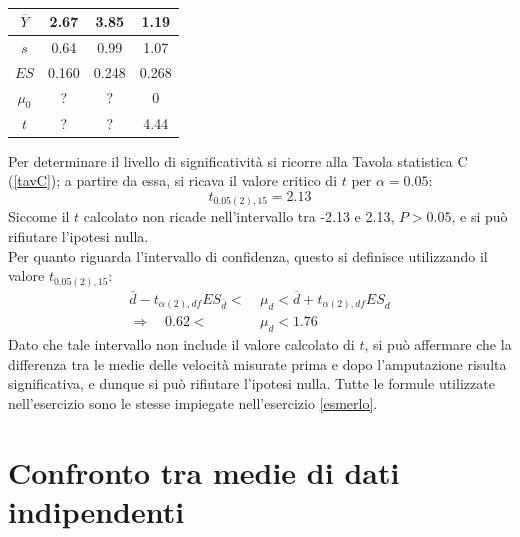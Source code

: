 \documentclass[10pt, draft]{book}
\newcounter{example}[section]
\begin{document}
\begin{example}
\begin{table}[H]
\begin{tabular}{c|c|c||c}
        \textbf{$\overline{Y}$} & 2.67 & 3.85 & 1.19\\
        \hline
        \textbf{$s$} & 0.64 & 0.99 & 1.07\\
        \hline
        \textbf{$ES$} & 0.160 & 0.248 & 0.268\\
        \hline
        \textbf{$\mu_0$} & ? & ? & 0\\
        \hline
        \textbf{$t$} & ? & ? & 4.44\\
        \hline
        \end{tabular}
        \caption{\small{}}
        \label{tabamputazione2}
    \end{table}\noindent
    Per determinare il livello di significatività si ricorre alla Tavola statistica C (\ref{tavC}); a partire da essa, si ricava il valore critico di $t$ per $\alpha = 0.05$:
    \begin{equation}
        t_{0.05(2),15} = 2.13
    \end{equation}
    Siccome il $t$ calcolato non ricade nell'intervallo tra -2.13 e 2.13, $P>0.05$, e si può rifiutare l'ipotesi nulla.
    \\
    Per quanto riguarda l'intervallo di confidenza, questo si definisce utilizzando il valore $t_{0.05(2),15}$:
    \begin{align*}
        \overline{d}-t_{\alpha(2),df}ES_{\overline{d}}<\ &\mu_d<\overline{d}+t_{\alpha(2),df}ES_{\overline{d}}
        \\
        \Rightarrow \quad 0.62<\ &\mu_d<1.76
    \end{align*}
    Dato che tale intervallo non include il valore calcolato di $t$, si può affermare che la differenza tra le medie delle velocità misurate prima e dopo l'amputazione risulta significativa, e dunque si può rifiutare l'ipotesi nulla.
    Tutte le formule utilizzate nell'esercizio sono le stesse impiegate nell'esercizio \ref{esmerlo}.
\end{example}

\section{Confronto tra medie di dati indipendenti}
\end{document}
